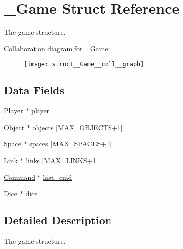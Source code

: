\hypertarget{struct__Game}{}\section{\+\_\+\+Game Struct Reference}
\label{struct__Game}


The game structure.  




Collaboration diagram for \+\_\+\+Game\+:\nopagebreak
\begin{figure}[H]
\begin{center}
\leavevmode
\texttt{[image: struct\_\_Game\_\_coll\_\_graph]}
\end{center}
\end{figure}
\subsection*{Data Fields}
\begin{DoxyCompactItemize}
\item 
\hyperlink{player_8h_af30e2030635a69690f85e48bc6ef202f}{Player} $\ast$ \hyperlink{struct__Game_a31406605782d71ec00c4bf258ea76267}{player}
\item 
\hyperlink{object_8h_a7f8bbcda919b65ce67f92fba08e0212f}{Object} $\ast$ \hyperlink{struct__Game_aa669bb857944c6c3b53504d179640af0}{objects} \mbox{[}\hyperlink{game_8h_acdc7844fbd4d45737d4aa56834d37829}{M\+A\+X\+\_\+\+O\+B\+J\+E\+C\+TS}+1\mbox{]}
\item 
\hyperlink{space_8h_a67533ffc2b70463baecc38fb0629bbfc}{Space} $\ast$ \hyperlink{struct__Game_ab4180417d9148f8abb2233ca6c4ecfe5}{spaces} \mbox{[}\hyperlink{space_8h_a5f54fd55f983a2e33ce076cd9f587e82}{M\+A\+X\+\_\+\+S\+P\+A\+C\+ES}+1\mbox{]}
\item 
\hyperlink{link_8h_ae3b299941e67be6971bfd64a25505eff}{Link} $\ast$ \hyperlink{struct__Game_a672f97aff892c65a6fdb43665cb57c97}{links} \mbox{[}\hyperlink{game_8h_a660ed1ec8604982002a0d6eced0e0367}{M\+A\+X\+\_\+\+L\+I\+N\+KS}+1\mbox{]}
\item 
\hyperlink{command_8h_a7d2935971c252377cb0fc1c8545dc2bc}{Command} $\ast$ \hyperlink{struct__Game_a47afef4b632256566d81da0f50e7a380}{last\+\_\+cmd}
\item 
\hyperlink{dice_8h_a5910ae86cf402855269700abd23e3976}{Dice} $\ast$ \hyperlink{struct__Game_af7004361a877182511a3e501b0949220}{dice}
\end{DoxyCompactItemize}


\subsection{Detailed Description}
The game structure. 

